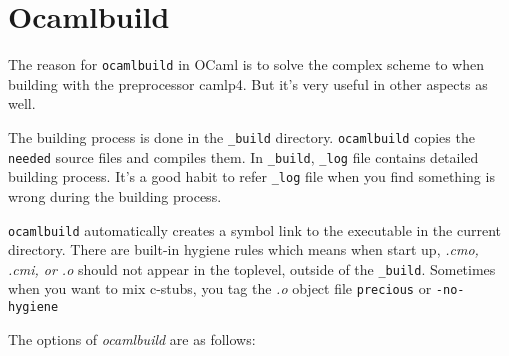 \section{Ocamlbuild}
The reason for \verb|ocamlbuild| in OCaml is to solve the complex
scheme to when building with the preprocessor camlp4. But it's very
useful in other aspects as well.

The building process is done in the \verb|_build|
directory. \verb|ocamlbuild| copies the \verb|needed| source files and
compiles them.  In \verb|_build|, \verb|_log| file contains detailed
building process. It's a good habit to refer \verb|_log| file when you
find something is wrong during the building process.

\verb|ocamlbuild| automatically creates a symbol link to the
executable in the current directory.  There are built-in hygiene rules
which means when start up, \textit{.cmo, .cmi, or .o} should not
appear in the toplevel, outside of the \verb|_build|. Sometimes when
you want to mix c-stubs, you tag the \textit{.o} object file
\verb|precious| or \verb|-no-hygiene|

The options of \textit{ocamlbuild} are as follows:

